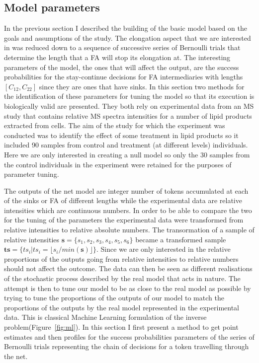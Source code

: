 \subsection{Model parameters}
In the previous section I described the building of the basic model
based on the goals and assumptions of the study. The elongation aspect
that we are interested in was reduced down to a sequence of successive
series of Bernoulli trials that determine the length that a FA will
stop its elongation at. The interesting parameters of the model, the
ones that will affect the output, are the success probabilities for
the stay-continue decisions for FA intermediaries with lengths
$[C_{12}, C_{22}]$ since they are ones that have sinks. In this
section two methods for the identification of these parameters for
tuning the model so that its execution is biologically valid are
presented. They both rely on experimental data from an MS study that
contains relative MS spectra intensities for a number of lipid
products extracted from cells. The aim of the study for which the
experiment was conducted was to identify the effect of some treatment
in lipid products so it included 90 samples from control and treatment
(at different levels) individuals. Here we are only interested in creating a null
model so only the 30 samples from the control individuals in the
experiment were retained for
the purposes of parameter tuning.

The outputs of the net model are integer number of tokens accumulated
at each of the sinks or FA of different lengths while the experimental
data are relative intensities which are continuous numbers. In order
to be able to compare the two for the tuning of the parameters the
experimental data were transformed from relative intensities to
relative absolute numbers. The transormation of a sample of relative
intensities $\mathbf{s} = \{s_1, s_2, s_3, s_4, s_5, s_6\}$ became a
transformed sample $\mathbf{ts} = \{ ts_i | ts_i = \lfloor s_i /
min(\mathbf{s}) \rfloor \}$.
 Since we are only interested in the
relative proportions of the outputs going from relative intensities to
relative numbers should not affect the outcome. The data can then be
seen as different realisations of the stochastic process described by
the real model that acts in nature. The attempt is then to tune our
model to be as close to the real model as possible by trying to tune
the proportions of the outputs of our model to match the proportions
of the outputs by the real model represented in the experimental
data. This is  classical Machine Learning formulation of the inverse
problem(Figure~\ref{fig:ml}). In this section I first present a method to get point
estimates and then profiles for the success probabilities parameters of the series of Bernoulli
trials representing the chain of decisions for a token travelling
through the net.


